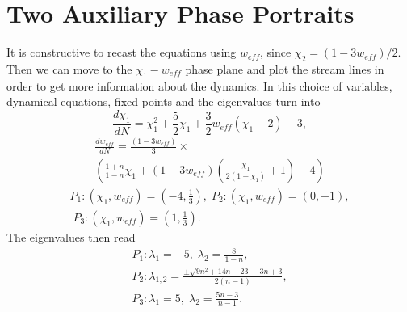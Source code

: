 \documentclass[a4paper,11pt]{article}
\begin{document}
\section{Two Auxiliary Phase Portraits}
It is constructive to recast the equations using $w_{eff}$, since $\chi_2=(1-3w_{eff})/2$. Then we can move to the $\chi_1- w_{eff}$ phase plane and plot the stream lines in order to get more information about the dynamics. In this choice of variables, dynamical equations, fixed points and the eigenvalues turn into
\begin{equation}
\frac{d\chi_1}{dN}=\chi_1^2+\frac{5}{2}\chi_1+\frac{3}{2}w_{eff}(\chi_1-2)-3,
\label{wef1}
\end{equation}
\begin{equation}
\begin{aligned}
\frac{d w_{eff}}{dN}=\frac{(1-3 w_{eff})}{3}\times\;\;\\\left(\frac{1+n}{1-n}\chi_1+(1-3 w_{eff})\left(\frac{\chi_1}{2(1-\chi_1)}+1\right) -4\right)
\end{aligned}
\end{equation}
\begin{equation}
\begin{aligned}
P_1: (\chi_1,w_{eff})=(-4,\frac{1}{3}),\;
P_2: (\chi_1,w_{eff})=(0,-1),\\\;
P_3: (\chi_1,w_{eff})=(1,\frac{1}{3}).
\end{aligned} 
\end{equation}
The eigenvalues then read
\begin{equation}
\begin{aligned}
P_1: \lambda_1=-5,\; \lambda_2=\frac{8}{1-n},\\
P_2: \lambda_{1,2}=\frac{\pm\sqrt{9 n^2+14 n-23}-3 n+3}{2 (n-1)},\\
P_3: \lambda_1=5,\; \lambda_2=\frac{5n-3}{n-1}.
\end{aligned}
\end{equation}
\end{document}
